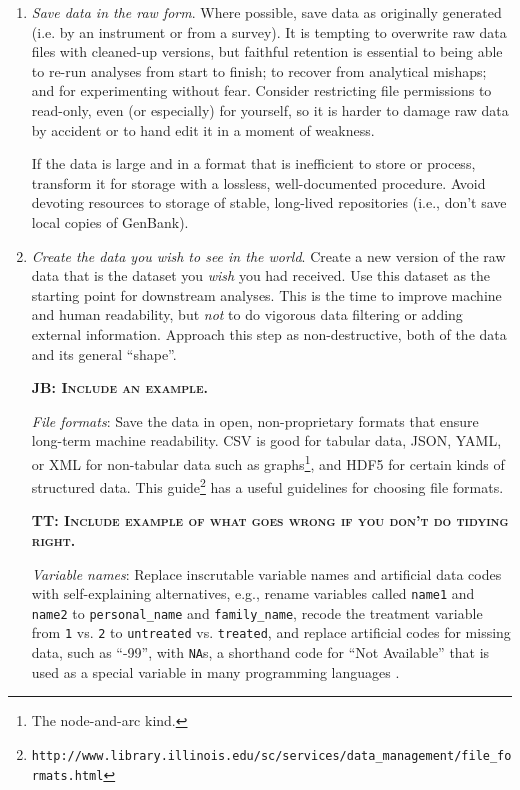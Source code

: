 \documentclass[10pt]{article}
\newcommand{\fixme}[2]{\textsc{\textbf{{#1}: {#2}}}}
\newcommand{\recommend}[1]{\textit{#1}}
\newcommand{\withurl}[2]{{#1}\footnote{\texttt{#2}}}
\begin{document}
\begin{enumerate}

\item
  \recommend{Save data in the raw form}.  Where possible,
  save data as originally generated (i.e. by an instrument or from a survey). 
  It is
  tempting to overwrite raw data files with cleaned-up versions, but
  faithful retention is essential to being able to re-run analyses
  from start to finish; to recover from analytical
  mishaps; and for experimenting without fear. Consider restricting file permissions to read-only,
  even (or especially) for yourself, so it is harder to damage raw
  data by accident or to hand edit it in a moment of weakness.

  If the data is large and in a format that is inefficient to store or process, 
  transform it for storage with a lossless, well-documented procedure.  
  Avoid devoting resources to storage of stable, long-lived repositories 
  (i.e., don't save local copies of GenBank).
  
\item
  \recommend{Create the data you wish to see in the world}. Create a new version of the raw data 
  that is the dataset you \emph{wish} 
  you had received. Use 
  this dataset as the starting point for downstream analyses.
  This is the time to improve machine and human readability, but
  \emph{not} to do vigorous data filtering or adding 
  external information. Approach this step as non-destructive, both of the data and its general ``shape''.

  \fixme{JB}{Include an example.}

  \emph{File formats}: Save the data in open, non-proprietary 
  formats that ensure long-term machine readability.  CSV is good for 
  tabular data, JSON, YAML, or XML for non-tabular data such as
  graphs\footnote{The node-and-arc kind.}, and HDF5 for certain kinds
  of structured data.  \withurl{This
    guide}{http://www.library.illinois.edu/sc/services/data\_management/file\_formats.html}
  has a useful guidelines for choosing file formats.

  \fixme{TT}{Include example of what goes wrong if you don't do tidying right.}

  \emph{Variable names}: Replace inscrutable variable names
  and artificial data codes with self-explaining alternatives, e.g.,
  rename variables called \texttt{name1} and \texttt{name2} to
  \texttt{personal\_name} and \texttt{family\_name}, recode the
  treatment variable from \texttt{1} vs.  \texttt{2} to
  \texttt{untreated} vs. \texttt{treated}, and replace artificial
  codes for missing data, such as ``-99'', with \texttt{NA}s,
  a shorthand code for ``Not Available'' that is used as a special variable
  in many programming languages \cite{white2013}.


\end{enumerate}
\end{document}
